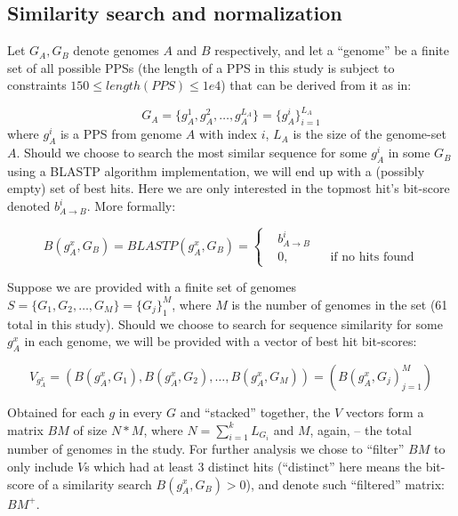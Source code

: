 \subsection{Similarity search and normalization}
Let $G_A, G_B$ denote genomes $A$ and $B$ respectively,
and let a ``genome'' be a finite set of all possible PPSs
(the length of a PPS in this study is subject to constraints
$150 \leq length(PPS) \leq 1e4$) that can be derived from it as in:

\begin{equation}
G_A = \{g_A^1, g_A^2, \ldots, g_A^{L_A}\} = \{g_A^i\}_{i=1}^{L_A}
\end{equation}
where $g_A^i$ is a PPS from genome $A$ with index $i$, $L_A$ is the size of
the genome-set $A$.
Should we choose to search the most similar sequence for some $g_A^i$ in some
$G_B$ using a BLASTP algorithm implementation, we will end up with a (possibly
empty) set of best hits. Here we are only interested in the topmost hit's
bit-score denoted $b_{A \rightarrow B}^i$. More formally:

\begin{equation}
B(g_A^x, G_B) = BLASTP(g_A^x, G_B)=\left \{
\begin{aligned}
&b_{A \rightarrow B}^i\\
&0, && \text{if no hits found}
\end{aligned} \right.
\end{equation}

Suppose we are provided with a finite set of genomes \\
$S = \{G_1, G_2, \ldots, G_M\} = \{G_j\}_1^M$, where $M$ is the number of
genomes in the set (61 total in this study). Should we choose to search for
sequence similarity for some $g_A^x$ in each genome, we will be provided with a
vector of best hit bit-scores:

\begin{equation}
V_{g_A^x} = (B(g_A^x, G_1), B(g_A^x, G_2), \ldots, B(g_A^x, G_M)) = (B(g_A^x,
G_j)_{j=1}^M)
\end{equation}

Obtained for each $g$ in every $G$ and ``stacked'' together, the $V$ vectors
form a matrix $BM$ of size $N*M$, where $N=\sum_{i=1}^k L_{G_i}$ and $M$,
again, -- the total number of genomes in the study. For further analysis we chose
to ``filter'' $BM$ to only include $V$s which had at least 3 distinct hits
(``distinct'' here means the bit-score of a similarity search $B(g_A^x,
G_B)>0$), and denote such ``filtered'' matrix: $BM^+$.

